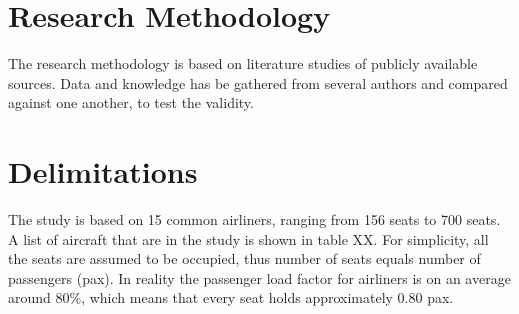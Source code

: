 \documentclass[english]{kththesis}
\begin{document}
\section{Research Methodology}

The research methodology is based on literature studies of publicly available sources. Data and knowledge has be gathered from several authors and compared against one another, to test the validity.

\section{Delimitations}

The study is based on 15 common airliners, ranging from 156 seats to 700 seats. A list of aircraft that are in the study is shown in table XX. For simplicity, all the seats are assumed to be occupied, thus number of seats equals number of passengers (pax). In reality the passenger load factor for airliners is on an average around 80\%, which means that every seat holds approximately 0.80 pax.
\end{document}
